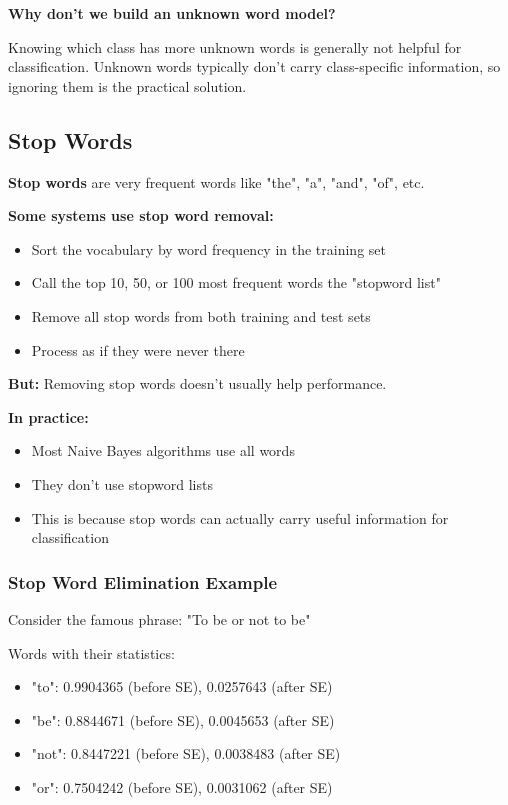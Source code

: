 \documentclass[11pt,a4paper]{article}
\theoremstyle{definition}
\theoremstyle{plain}
\theoremstyle{remark}
\begin{document}
\textbf{Why don't we build an unknown word model?}

Knowing which class has more unknown words is generally not helpful for classification. Unknown words typically don't carry class-specific information, so ignoring them is the practical solution.

\subsection{Stop Words}

\textbf{Stop words} are very frequent words like "the", "a", "and", "of", etc.

\textbf{Some systems use stop word removal:}
\begin{itemize}
    \item Sort the vocabulary by word frequency in the training set
    \item Call the top 10, 50, or 100 most frequent words the "stopword list"
    \item Remove all stop words from both training and test sets
    \item Process as if they were never there
\end{itemize}

\textbf{But:} Removing stop words doesn't usually help performance.

\textbf{In practice:}
\begin{itemize}
    \item Most Naive Bayes algorithms use all words
    \item They don't use stopword lists
    \item This is because stop words can actually carry useful information for classification
\end{itemize}

\subsubsection{Stop Word Elimination Example}

Consider the famous phrase: "To be or not to be"

Words with their statistics:
\begin{itemize}
    \item "to": 0.9904365 (before SE), 0.0257643 (after SE)
    \item "be": 0.8844671 (before SE), 0.0045653 (after SE)
    \item "not": 0.8447221 (before SE), 0.0038483 (after SE)
    \item "or": 0.7504242 (before SE), 0.0031062 (after SE)
\end{itemize}
\end{document}
